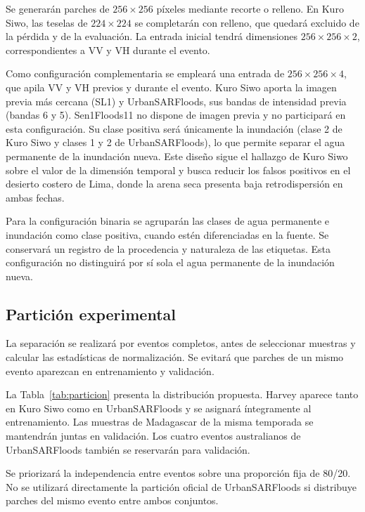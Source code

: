 \documentclass[conference]{IEEEtran}
\begin{document}
Se generarán parches de $256\times256$ píxeles
mediante recorte o relleno. En Kuro Siwo,
las teselas de $224\times224$ se completarán
con relleno, que quedará excluido de la pérdida
y de la evaluación. La entrada inicial tendrá
dimensiones $256\times256\times2$, correspondientes
a VV y VH durante el evento.

Como configuración complementaria se empleará
una entrada de $256\times256\times4$, que apila
VV y VH previos y durante el evento. Kuro Siwo
aporta la imagen previa más cercana (SL1) y
UrbanSARFloods, sus bandas de intensidad previa
(bandas 6 y 5). Sen1Floods11 no dispone de imagen
previa y no participará en esta configuración.
Su clase positiva será únicamente la inundación
(clase 2 de Kuro Siwo y clases 1 y 2 de
UrbanSARFloods), lo que permite separar el agua
permanente de la inundación nueva. Este diseño
sigue el hallazgo de Kuro Siwo sobre el valor
de la dimensión temporal \cite{bountos2024kurosiwo}
y busca reducir los falsos positivos en el
desierto costero de Lima, donde la arena seca
presenta baja retrodispersión en ambas fechas.

Para la configuración binaria se agruparán
las clases de agua permanente e inundación
como clase positiva, cuando estén diferenciadas
en la fuente. Se conservará un registro de
la procedencia y naturaleza de las etiquetas.
Esta configuración no distinguirá por sí sola
el agua permanente de la inundación nueva.

\subsection{Partición experimental}
\label{subsec:particion}

La separación se realizará por eventos completos,
antes de seleccionar muestras y calcular
las estadísticas de normalización. Se evitará
que parches de un mismo evento aparezcan
en entrenamiento y validación.

La Tabla~\ref{tab:particion} presenta la distribución
propuesta. Harvey aparece tanto en Kuro Siwo como
en UrbanSARFloods y se asignará íntegramente
al entrenamiento. Las muestras de Madagascar
de la misma temporada se mantendrán juntas
en validación. Los cuatro eventos australianos
de UrbanSARFloods también se reservarán
para validación.

Se priorizará la independencia entre eventos
sobre una proporción fija de 80/20. No se
utilizará directamente la partición oficial
de UrbanSARFloods si distribuye parches
del mismo evento entre ambos conjuntos.
\end{document}
